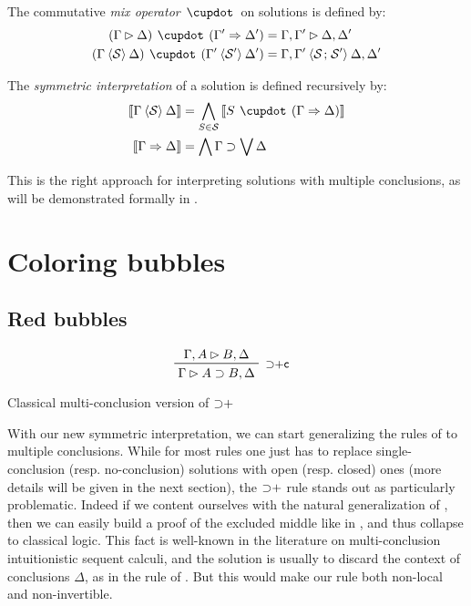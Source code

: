 \begin{definition}
  The commutative \emph{mix operator} $\mix$ on solutions is defined by:
  \begin{align*}
    (\Gamma \J \Delta) \mix (\Gamma' \seq \Delta') &=
      \Gamma, \Gamma' \J \Delta, \Delta' \\
    (\Gamma \piq{\cS} \Delta) \mix (\Gamma' \piq{\mathcal{S'}} \Delta') &=
      \Gamma, \Gamma' \piq{\cS \sep \mathcal{S'}} \Delta, \Delta' \\
  \end{align*}
\end{definition}

\begin{definition}
  The \emph{symmetric interpretation} of a solution is defined recursively by:
  \begin{align*}
    \sint{\Gamma \piq{\cS} \Delta} &=
      \bigwedge_{S \in \cS} \sint{S \mix (\Gamma \seq \Delta)} \\
    \sint{\Gamma \seq \Delta} &=
      \bigwedge \Gamma \limp \bigvee \Delta
  \end{align*}
\end{definition}

This is the right approach for interpreting solutions with multiple conclusions,
as will be demonstrated formally in .

\section{Coloring bubbles}

\subsection{Red bubbles}

\begin{marginfigure}
  $$
  \R[\mathsf{{\limp}{+}c}]
    {\Gamma, A \J B, \Delta}
    {\Gamma \J A \limp B, \Delta}
  $$
  \caption{Classical multi-conclusion version of ${\supset}{+}$}
\end{marginfigure}

With our new symmetric interpretation, we can start generalizing the rules of
 to multiple conclusions. While for most rules one just has to replace
single-conclusion (resp. no-conclusion) solutions with open (resp. closed) ones
(more details will be given in the next section), the ${\supset}{+}$ rule stands
out as particularly problematic. Indeed if we content ourselves with the natural
generalization {} of , then we can
easily build a proof of the excluded middle like in , and thus
collapse to classical logic. This fact is well-known in the literature on
multi-conclusion intuitionistic sequent calculi, and the solution is usually to
discard the context of conclusions $\Delta$, as in the {} rule
of . But this would make our rule both non-local and
non-invertible.

